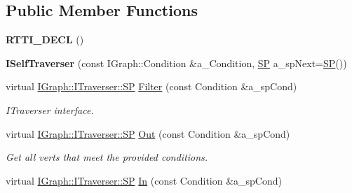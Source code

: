 \subsection*{Public Member Functions}
\begin{DoxyCompactItemize}
\item 
\mbox{\label{class_graph_self_1_1_i_self_traverser_a27076dec5fad599255baa06f60e95c33}} 
{\bfseries R\+T\+T\+I\+\_\+\+D\+E\+CL} ()
\item 
\mbox{\label{class_graph_self_1_1_i_self_traverser_a36c7f8b84b954ea9464a7abcc2521687}} 
{\bfseries I\+Self\+Traverser} (const I\+Graph\+::\+Condition \&a\+\_\+\+Condition, \hyperlink{class_i_graph_1_1_i_traverser_a5a5ccc81423d6024742d1898a310d812}{SP} a\+\_\+sp\+Next=\hyperlink{class_i_graph_1_1_i_traverser_a5a5ccc81423d6024742d1898a310d812}{SP}())
\item 
\mbox{\label{class_graph_self_1_1_i_self_traverser_abaebcd6e326948043b1c703602acde32}} 
virtual \hyperlink{class_i_graph_1_1_i_traverser_a5a5ccc81423d6024742d1898a310d812}{I\+Graph\+::\+I\+Traverser\+::\+SP} \hyperlink{class_graph_self_1_1_i_self_traverser_abaebcd6e326948043b1c703602acde32}{Filter} (const Condition \&a\+\_\+sp\+Cond)
\begin{DoxyCompactList}\small\item\em I\+Traverser interface. \end{DoxyCompactList}\item 
\mbox{\label{class_graph_self_1_1_i_self_traverser_a93c9e7956c64fa96177dc7c855090df9}} 
virtual \hyperlink{class_i_graph_1_1_i_traverser_a5a5ccc81423d6024742d1898a310d812}{I\+Graph\+::\+I\+Traverser\+::\+SP} \hyperlink{class_graph_self_1_1_i_self_traverser_a93c9e7956c64fa96177dc7c855090df9}{Out} (const Condition \&a\+\_\+sp\+Cond)
\begin{DoxyCompactList}\small\item\em Get all verts that meet the provided conditions. \end{DoxyCompactList}\item 
\mbox{\label{class_graph_self_1_1_i_self_traverser_a79bc80c7af5398f4413f5fc2b3be45cb}} 
virtual \hyperlink{class_i_graph_1_1_i_traverser_a5a5ccc81423d6024742d1898a310d812}{I\+Graph\+::\+I\+Traverser\+::\+SP} \hyperlink{class_graph_self_1_1_i_self_traverser_a79bc80c7af5398f4413f5fc2b3be45cb}{In} (const Condition \&a\+\_\+sp\+Cond)

\end{DoxyCompactItemize}
